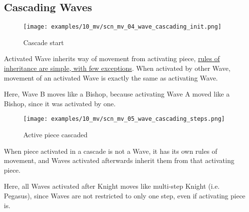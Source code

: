 \clearpage %

\subsection*{Cascading Waves}

\vspace*{-3.0ex}
\noindent
\begin{figure}[h]
\texttt{[image: examples/10\_mv/scn\_mv\_04\_wave\_cascading\_init.png]}
\caption{Cascade start}
\label{fig:scn_mv_04_wave_cascading_init}
\end{figure}

Activated Wave inherits way of movement from activating piece,
\hyperref[sec:Appendix/Movement of Wave]{rules of inheritance are simple, with few exceptions}.
When activated by other Wave, movement of an activated Wave is exactly the same as
activating Wave.

Here, Wave B moves like a Bishop, because activating Wave A moved like a Bishop,
since it was activated by one.

\clearpage %

\vspace*{-5.0ex}
\noindent
\begin{figure}[h]
\texttt{[image: examples/10\_mv/scn\_mv\_05\_wave\_cascading\_steps.png]}
\caption{Active piece cascaded}
\label{fig:scn_mv_05_wave_cascading_steps}
\end{figure}

When piece activated in a cascade is not a Wave, it has its own rules of movement, and
Waves activated afterwards inherit them from that activating piece.

Here, all Waves activated after Knight moves like multi-step Knight (i.e. Pegasus),
since Waves are not restricted to only one step, even if activating piece is.

\clearpage %

